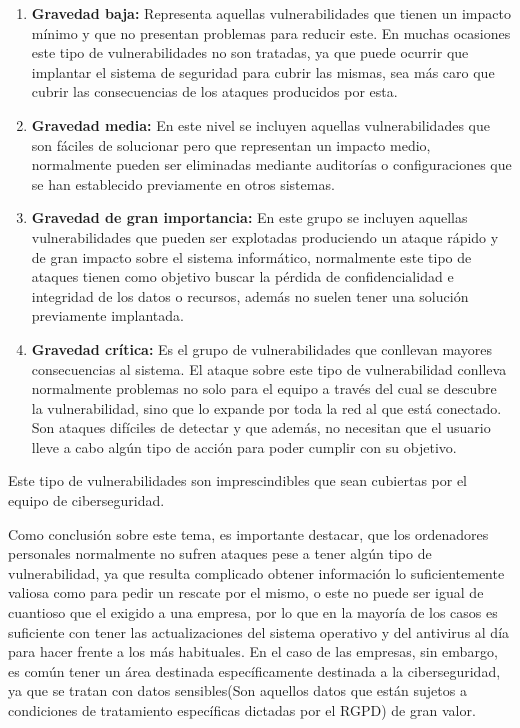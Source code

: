 \begin{enumerate}
\item {\bfseries Gravedad baja: }
Representa aquellas vulnerabilidades que tienen un impacto mínimo y que no presentan problemas para reducir este. En muchas ocasiones este tipo de vulnerabilidades no son tratadas, ya que puede ocurrir que implantar el sistema de seguridad para cubrir las mismas, sea más caro que cubrir las consecuencias de los ataques producidos por esta.
\item {\bfseries Gravedad media: }
En este nivel se incluyen aquellas vulnerabilidades que son fáciles de solucionar pero que representan un impacto medio, normalmente pueden ser eliminadas mediante auditorías o configuraciones que se han establecido previamente en otros sistemas.
\item {\bfseries Gravedad de gran importancia:}
En este grupo se incluyen aquellas vulnerabilidades que pueden ser explotadas produciendo un ataque rápido y de gran impacto sobre el sistema informático, normalmente este tipo de ataques tienen como objetivo buscar la pérdida de confidencialidad e integridad de los datos o recursos, además no suelen tener una solución previamente implantada.
\item {\bfseries Gravedad crítica: }
Es el grupo de vulnerabilidades que conllevan mayores consecuencias al sistema. El ataque sobre este tipo de vulnerabilidad conlleva normalmente problemas no solo para el equipo a través del cual se descubre la vulnerabilidad, sino que lo expande por toda la red al que está conectado. Son ataques difíciles de detectar y que además, no necesitan que el usuario lleve a cabo algún tipo de acción para poder cumplir con su objetivo.
\end{enumerate}
Este tipo de vulnerabilidades son imprescindibles que sean cubiertas por el equipo de ciberseguridad.

Como conclusión sobre este tema, es importante destacar, que los ordenadores personales normalmente no sufren ataques pese a tener algún tipo de vulnerabilidad, ya que resulta complicado obtener información lo suficientemente valiosa como para pedir un rescate por el mismo, o este no puede ser igual de cuantioso que el exigido a una empresa, por lo que en la mayoría de los casos es suficiente con tener las actualizaciones del sistema operativo y del antivirus al día para hacer frente a los más habituales.
En el caso de las empresas, sin embargo, es común tener un área destinada específicamente destinada a la ciberseguridad, ya que se tratan con datos sensibles(Son aquellos datos que están sujetos a condiciones de tratamiento específicas dictadas por el RGPD) de gran valor. 

